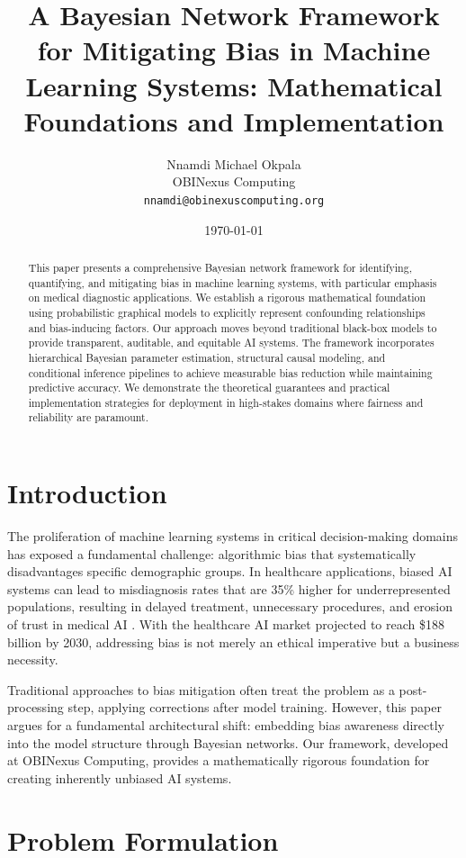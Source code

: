 \documentclass[11pt,a4paper]{article}
\title{\textbf{A Bayesian Network Framework for Mitigating Bias in Machine Learning Systems: Mathematical Foundations and Implementation}}
\author{
Nnamdi Michael Okpala\\
OBINexus Computing\\
\texttt{nnamdi@obinexuscomputing.org}
}
\date{\today}
\theoremstyle{plain}
\theoremstyle{definition}
\theoremstyle{remark}
\begin{document}
\maketitle

\begin{abstract}
This paper presents a comprehensive Bayesian network framework for identifying, quantifying, and mitigating bias in machine learning systems, with particular emphasis on medical diagnostic applications. We establish a rigorous mathematical foundation using probabilistic graphical models to explicitly represent confounding relationships and bias-inducing factors. Our approach moves beyond traditional black-box models to provide transparent, auditable, and equitable AI systems. The framework incorporates hierarchical Bayesian parameter estimation, structural causal modeling, and conditional inference pipelines to achieve measurable bias reduction while maintaining predictive accuracy. We demonstrate the theoretical guarantees and practical implementation strategies for deployment in high-stakes domains where fairness and reliability are paramount.
\end{abstract}

\section{Introduction}

The proliferation of machine learning systems in critical decision-making domains has exposed a fundamental challenge: algorithmic bias that systematically disadvantages specific demographic groups. In healthcare applications, biased AI systems can lead to misdiagnosis rates that are 35\% higher for underrepresented populations, resulting in delayed treatment, unnecessary procedures, and erosion of trust in medical AI \cite{obermeyer2019dissecting}. With the healthcare AI market projected to reach \$188 billion by 2030, addressing bias is not merely an ethical imperative but a business necessity.

Traditional approaches to bias mitigation often treat the problem as a post-processing step, applying corrections after model training. However, this paper argues for a fundamental architectural shift: embedding bias awareness directly into the model structure through Bayesian networks. Our framework, developed at OBINexus Computing, provides a mathematically rigorous foundation for creating inherently unbiased AI systems.

\section{Problem Formulation}
\end{document}
